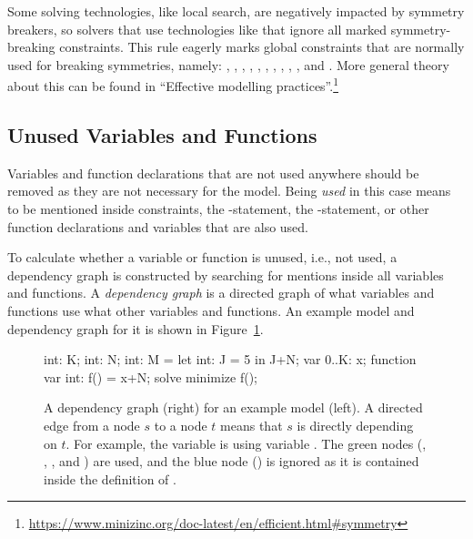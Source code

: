 \documentclass[a4paper,12pt]{article}
\begin{document}
\begin{sloppypar}
Some solving technologies, like local search, are negatively impacted
by symmetry breakers, so solvers that use technologies like that ignore all marked
symmetry-breaking constraints. This rule eagerly marks global constraints that are
normally used for breaking symmetries, namely: , , , , ,
, , , , , and .
More general theory about this can be found in
``Effective modelling practices''.\footnote{\url{https://www.minizinc.org/doc-latest/en/efficient.html\#symmetry}}
\end{sloppypar}

\subsection{Unused Variables and Functions}\label{sec:rule:unused}
Variables and function declarations that are not used anywhere 
should be removed as they are not necessary for the model.
Being \emph{used} in this case means to be mentioned inside constraints, 
the -statement, the -statement, or other function declarations and
variables that are also used.

To calculate whether a variable or function is unused, i.e., not used, a dependency graph is
constructed by searching for mentions inside all variables and functions.
A \emph{dependency graph} is a directed graph of what variables and functions use
what other variables and functions. An example model and dependency graph for it is shown in
Figure~\ref{fig:unused:graph}.

\begin{figure}[t]
  \centering
  \smallskip%
  \begin{minipage}[t]{0.5\textwidth}
  \vspace{0pt}
  \begin{mznno}
int: K;
int: N;
int: M = let {int: J = 5}
         in J+N;
var 0..K: x;
function var int: f() = x+N;
solve minimize f();
  \end{mznno}
  \end{minipage}%
  \begin{minipage}[t]{0.5\textwidth}
    \vspace{0pt}
    \begin{center}
      
    \end{center}
  \end{minipage}
  \smallskip%
  \caption{A dependency graph (right) for an example model (left).
    A directed edge from a node $s$ to a node $t$ means
    that $s$ is directly depending on $t$. 
    For example, the variable  is using variable
    . The green nodes (, , , and ) are used, and
    the blue node () is ignored as it is contained inside the definition of .}%
  \label{fig:unused:graph}
\end{figure}
\end{document}
